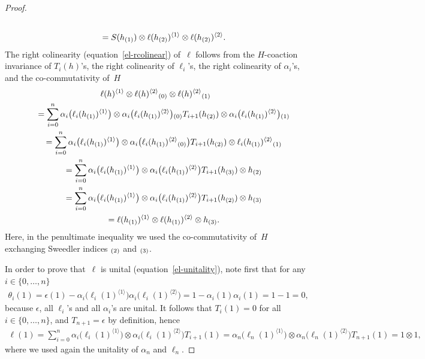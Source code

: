 \documentclass[11pt]{article}
\def\sw#1{{\sb{(#1)}}}
\newcommand{\ls}[1]{\ell(#1)^{\langle 1\rangle}}
\newcommand{\rs}[1]{\ell(#1)^{\langle 2\rangle}}
\newcommand{\lls}[2]{\ell_{#1}(#2)^{\langle 1\rangle}}
\newcommand{\rrs}[2]{\ell_{#1}(#2)^{\langle 2\rangle}}
\begin{document}
\begin{proof}
\begin{gather*}
\\
\qquad=
S(h\sw{1})\otimes\ls{h\sw{2}}\otimes\rs{h\sw{2}}.
\end{gather*}
The right colinearity %
(equation~\eqref{el-rcolinear}) of~$\ell$ follows from the $H$-coaction invariance of $T_i(h)$'s,
the right colinearity of $\ell_i$'s, the right colinearity of $\alpha_i$'s, and the co-commutativity of~$H$
\begin{gather*}
\ls{h}\otimes\rs{h}\sw{0}\otimes\rs{h}\sw{1}
\\
\qquad=
\sum\limits_{i=0}^n\alpha_i\big(\lls{i}{h\sw{1}}\big)\otimes
\alpha_i\big(\rrs{i}{h\sw{1}}\big)\sw{0}T_{i+1}(h\sw{2})\otimes\alpha_i\big(\rrs{i}{h\sw{1}}\big)\sw{1}
\\
\qquad=
\sum\limits_{i=0}^n\alpha_i\big(\lls{i}{h\sw{1}}\big)\otimes
\alpha_i\big(\rrs{i}{h\sw{1}}\sw{0}\big)T_{i+1}(h\sw{2})\otimes\rrs{i}{h\sw{1}}\sw{1}
\\
\qquad=
\sum\limits_{i=0}^n\alpha_i\big(\lls{i}{h\sw{1}}\big)\otimes \alpha_i\big(\rrs{i}{h\sw{1}}\big)T_{i+1}(h\sw{3})\otimes h\sw{2}
\\
\qquad=
\sum\limits_{i=0}^n\alpha_i\big(\lls{i}{h\sw{1}}\big)\otimes \alpha_i\big(\rrs{i}{h\sw{1}}\big)T_{i+1}(h\sw{2})\otimes h\sw{3}
\\
\qquad=
\ls{h\sw{1}}\otimes\rs{h\sw{1}}\otimes h\sw{3}.
\end{gather*}
Here, in the penultimate inequality we used the co-commutativity of~$H$ exchanging Sweedler indices $\sw{2}$ and $\sw{3}$.

In order to prove that~$\ell$ is unital (equation~\eqref{el-unitality}), note f\/irst that for any $i\in\{0,\ldots,n\}$
\begin{gather*}
\theta_i(1)={\epsilon}(1)-\alpha_i\big(\lls{i}{1}\big)\alpha_{i}\big(\rrs{i}{1}\big)=1-\alpha_i(1)\alpha_i(1)=1-1=0,
\end{gather*}
because ${\epsilon}$, all $\ell_i$'s and all $\alpha_i$'s are unital.
It follows that $T_i(1)=0$ for all $i\in\{0,\ldots,n\}$, and $T_{n+1}={\epsilon}$ by def\/inition, hence
\begin{gather*}
\ell(1)=\sum\limits_{i=0}^n\!\alpha_i\big(\lls{i}{1}\big)\otimes\alpha_i\big(\rrs{i}{1}\big)T_{i+1}(1)
=\alpha_n\big(\lls{n}{1}\big)\otimes\alpha_n\big(\rrs{n}{1}\big)T_{n+1}(1)=1\otimes1,
\end{gather*}
where we used again the unitality of $\alpha_n$ and $\ell_n$.


\end{proof}
\end{document}
